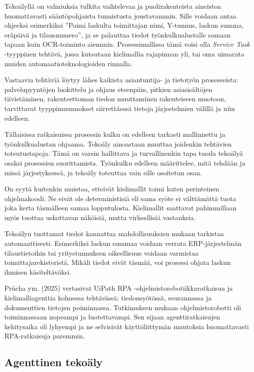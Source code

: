 \documentclass[
  finnish,
  letterpaper,
  DIV=11,
  numbers=noendperiod,
  oneside]{scrreprt}
\begin{document}
Tekoälyllä on valmiuksia tulkita vaihtelevaa ja puolirakenteista
aineistoa huomattavasti sääntöpohjaista tunnistusta joustavammin. Sille
voidaan antaa ohjeeksi esimerkiksi ''Poimi laskulta toimittajan nimi,
Y-tunnus, laskun summa, eräpäivä ja tilausnumero'', ja se palauttaa
tiedot työnkulkualustalle samaan tapaan kuin OCR-toiminto aiemmin.
Prosessimallissa tämä voisi olla \emph{Service Task} -tyyppinen tehtävä,
jossa kutsutaan kielimallia rajapinnan yli, tai oma uimarata muiden
automaatioteknologioiden rinnalla.

Vastaavia tehtäviä löytyy lähes kaikista asiantuntija- ja tietotyön
prosesseista: palvelupyyntöjen luokittelu ja ohjaus eteenpäin, pitkien
asiasisältöjen tiivistäminen, rakenteettoman tiedon muuttaminen
rakenteiseen muotoon, tarvittavat tyyppimuunnokset siirrettäessä tietoja
järjestelmien välillä ja niin edelleen.

Tällaisissa ratkaisuissa prosessin kulku on edelleen tarkasti
mallinnettu ja työnkulkualustan ohjaama. Tekoäly ainoastaan muuttaa
joidenkin tehtävien toteutustapoja. Tämä on varsin hallittava ja
turvallinenkin tapa tuoda tekoälyä osaksi prosessien suorittamista.
Työnkulku edelleen määrittelee, mitä tehdään ja missä järjestyksessä, ja
tekoäly toteuttaa vain sille osoitetun osan.

On syytä kuitenkin muistaa, etteivät kielimallit toimi kuten perinteinen
ohjelmakoodi. Ne eivät ole deterministisiä eli sama syöte ei välttämättä
tuota joka kerta täsmälleen samaa lopputulosta. Kielimallit saattavat
pahimmillaan myös tuottaa uskottavan näköisiä, mutta virheellisiä
vastauksia.

Tekoälyn tuottamat tiedot kannattaa mahdollisuuksien mukaan tarkistaa
automaattisesti. Esimerkiksi laskun summaa voidaan verrata
ERP-järjestelmän tilaustietoihin tai yritystunnuksen oikeellisuus
voidaan varmistaa toimittajarekisteristä. Mikäli tiedot eivät täsmää,
voi prosessi ohjata laskun ihmisen käsiteltäväksi.

Průcha ym. (2025) vertasivat UiPath RPA
-ohjelmistorobotiikkaratkaisua ja kielimalliagenttia kolmessa
tehtävässä: tiedonsyötössä, seurannassa ja dokumenttien tietojen
poiminnassa. Tutkimuksen mukaan ohjelmistorobotti oli toiminnassaan
nopeampi ja luotettavampi. Sen sijaan agenttiratkaisujen kehitysaika oli
lyhyempi ja ne selvisivät käyttöliittymän muutoksia huomattavasti
RPA-ratkaisuja paremmin.

\subsection{Agenttinen tekoäly}\label{agenttinen-tekouxe4ly}
\end{document}

